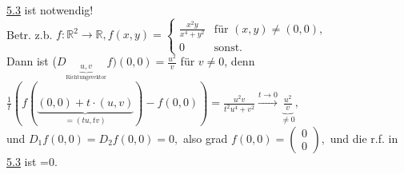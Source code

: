 \documentclass[]{scrartcl}
\begin{document}
\ul{5.3} ist notwendig!\\
Betr. z.b. $f:\mathbb{R}^2\rightarrow \mathbb{R}, f(x,y)=\begin{cases}
	\frac{x^2y}{x^4+y^2} &\text{für }(x,y)\neq (0,0),\\
	0&\text{sonst.}
\end{cases}$\\
	Dann ist 
	($D_{\underbrace{u,v}_{\text{Richtungsvektor}}}f)(0,0)=\frac{u^2}{v}$ für 
	$v\neq0$, denn 
	$\frac{1}{t}(f(\underbrace{(0,0)+t\cdot(u,v)}_{=(tu,tv)})-f(0,0))= 
	\frac{u^2v}{t^2u^4+v^2} 
	\xrightarrow{t\rightarrow0}\underbrace{\frac{u^2}{v}}_{\neq 0},$\\
	und $D_1f(0,0)=D_2f(0,0)=0,$ also grad $f(0,0)=\begin{pmatrix}
		0\\0
	\end{pmatrix},$ und die r.f. in \ul{5.3} ist =0.\\
\end{document}

